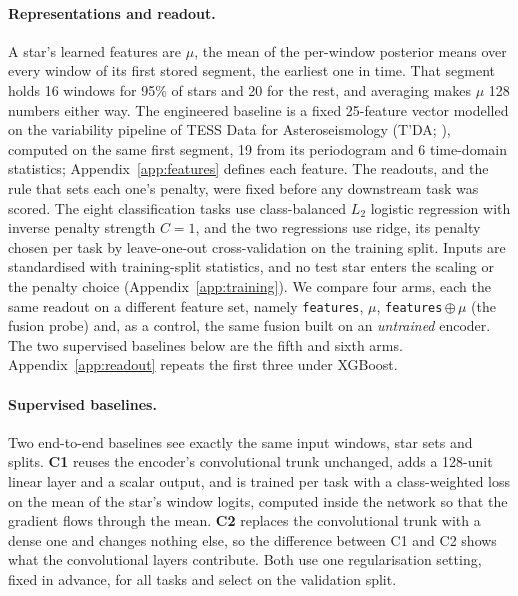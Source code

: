 \documentclass{article}
\begin{document}
\paragraph{Representations and readout.} A star's learned features are $\mu$, the mean of the
per-window posterior means over every window of its first stored segment, the earliest one in time.
That segment holds 16
windows for 95\% of stars and 20 for the rest, and averaging makes $\mu$ 128 numbers either way. The engineered baseline is a fixed 25-feature vector modelled on the variability pipeline of TESS Data for
Asteroseismology (T'DA; \citealt{audenaert2021}), computed on the same first segment, 19 from its periodogram and 6 time-domain statistics; Appendix~\ref{app:features} defines each feature. The readouts, and the rule that sets each one's
penalty, were fixed before any downstream task was scored. The eight classification tasks use
class-balanced $L_{2}$ logistic regression with inverse penalty strength $C = 1$, and the two
regressions use ridge, its penalty
chosen per task by leave-one-out cross-validation on the training split. Inputs are standardised with training-split
statistics, and no test star enters the scaling or the penalty choice (Appendix~\ref{app:training}). We compare four
arms, each the same readout on a different feature set, namely \texttt{features}, $\mu$,
\texttt{features}\,$\oplus\,\mu$ (the fusion probe) and, as a control, the same fusion built on an
\emph{untrained} encoder. The two supervised baselines below are the fifth and sixth arms.
Appendix~\ref{app:readout} repeats the first three under XGBoost.

\paragraph{Supervised baselines.} Two end-to-end baselines see exactly the same input windows, star
sets and splits. \textbf{C1} reuses the encoder's convolutional trunk unchanged, adds a 128-unit linear layer
and a scalar output, and is trained per task with a class-weighted loss on the mean of the star's window logits, computed
inside the network so that the gradient flows through the mean. \textbf{C2} replaces the convolutional trunk with a
dense one and changes nothing else, so the difference between C1 and C2 shows what the convolutional
layers contribute. Both
use one regularisation setting, fixed in advance, for all tasks and select on the validation split.
\end{document}
